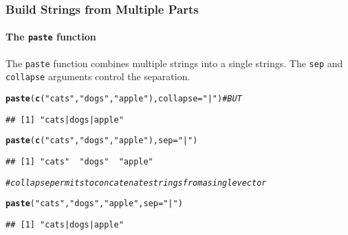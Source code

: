 \documentclass[paper=screen,mathserif]{beamer}\usepackage[]{graphicx}\usepackage[]{color}
\makeatletter
\newcommand{\hlstr}[1]{\textcolor[rgb]{0.192,0.494,0.8}{#1}}%
\newcommand{\hlcom}[1]{\textcolor[rgb]{0.678,0.584,0.686}{\textit{#1}}}%
\newcommand{\hlstd}[1]{\textcolor[rgb]{0.345,0.345,0.345}{#1}}%
\newcommand{\hlkwc}[1]{\textcolor[rgb]{0.333,0.667,0.333}{#1}}%
\newcommand{\hlkwd}[1]{\textcolor[rgb]{0.737,0.353,0.396}{\textbf{#1}}}%
\newenvironment{kframe}{%
 \def\at@end@of@kframe{}%
 \ifinner\ifhmode%
  \def\at@end@of@kframe{\end{minipage}}%
  \begin{minipage}{\columnwidth}%
 \fi\fi%
 \def\FrameCommand##1{\hskip\@totalleftmargin \hskip-\fboxsep
 \colorbox{shadecolor}{##1}\hskip-\fboxsep
     \hskip-\linewidth \hskip-\@totalleftmargin \hskip\columnwidth}%
 \MakeFramed {\advance\hsize-\width
   \@totalleftmargin\z@ \linewidth\hsize
   \@setminipage}}%
 {\par\unskip\endMakeFramed%
 \at@end@of@kframe}
\newenvironment{knitrout}{}{} %
\newcommand{\ft}[1]{\frametitle{#1}}
\newcommand{\fst}[1]{\framesubtitle{#1}}
\newenvironment{xframe}[1][]
{\begin{frame}[fragile,environment=xframe]
    \frametitle{#1}}
  {\end{frame}}
\makeatother
\begin{document}
\begin{xframe}
  \ft{Build Strings from Multiple Parts}
  \fst{The {\tt paste} function}
  
  The {\tt paste} function combines multiple strings into a single
  strings. The {\tt sep} and {\tt collapse} arguments control the
  separation. 
\begin{knitrout}\scriptsize
{}\color{fgcolor}\begin{kframe}
\begin{alltt}
\hlkwd{paste}\hlstd{(}\hlkwd{c}\hlstd{(}\hlstr{"cats"}\hlstd{,} \hlstr{"dogs"}\hlstd{,} \hlstr{"apple"}\hlstd{),} \hlkwc{collapse} \hlstd{=} \hlstr{"|"}\hlstd{)} \hlcom{# BUT}
\end{alltt}
\begin{verbatim}
## [1] "cats|dogs|apple"
\end{verbatim}
\begin{alltt}
\hlkwd{paste}\hlstd{(}\hlkwd{c}\hlstd{(}\hlstr{"cats"}\hlstd{,} \hlstr{"dogs"}\hlstd{,} \hlstr{"apple"}\hlstd{),} \hlkwc{sep} \hlstd{=} \hlstr{"|"}\hlstd{)}
\end{alltt}
\begin{verbatim}
## [1] "cats"  "dogs"  "apple"
\end{verbatim}
\begin{alltt}
\hlcom{# collapse permits to concatenate strings from a single vector}
\end{alltt}
\end{kframe}
\end{knitrout}
\begin{knitrout}\scriptsize
{}\color{fgcolor}\begin{kframe}
\begin{alltt}
\hlkwd{paste}\hlstd{(}\hlstr{"cats"}\hlstd{,} \hlstr{"dogs"}\hlstd{,} \hlstr{"apple"}\hlstd{,} \hlkwc{sep} \hlstd{=} \hlstr{"|"}\hlstd{)}
\end{alltt}
\begin{verbatim}
## [1] "cats|dogs|apple"
\end{verbatim}
\end{kframe}
\end{knitrout}

\end{xframe}
\end{document}
